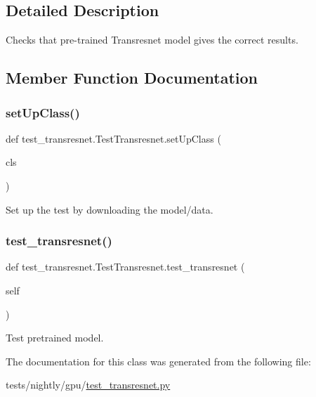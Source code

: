 \subsection{Detailed Description}
\begin{DoxyVerb}Checks that pre-trained Transresnet model gives the correct results.
\end{DoxyVerb}
 

\subsection{Member Function Documentation}
\mbox{\label{classtest__transresnet_1_1TestTransresnet_aafc17231f7444de8b09ff767920e8f85}} 
\subsubsection{\texorpdfstring{set\+Up\+Class()}{setUpClass()}}
{\footnotesize\ttfamily def test\+\_\+transresnet.\+Test\+Transresnet.\+set\+Up\+Class (\begin{DoxyParamCaption}\item[{}]{cls }\end{DoxyParamCaption})}

\begin{DoxyVerb}Set up the test by downloading the model/data.
\end{DoxyVerb}
 \mbox{\label{classtest__transresnet_1_1TestTransresnet_a6e1645b6a63146c1757aed9057b44d5e}} 
\subsubsection{\texorpdfstring{test\+\_\+transresnet()}{test\_transresnet()}}
{\footnotesize\ttfamily def test\+\_\+transresnet.\+Test\+Transresnet.\+test\+\_\+transresnet (\begin{DoxyParamCaption}\item[{}]{self }\end{DoxyParamCaption})}

\begin{DoxyVerb}Test pretrained model.
\end{DoxyVerb}
 

The documentation for this class was generated from the following file\+:\begin{DoxyCompactItemize}
\item 
tests/nightly/gpu/\hyperlink{test__transresnet_8py}{test\+\_\+transresnet.\+py}\end{DoxyCompactItemize}
